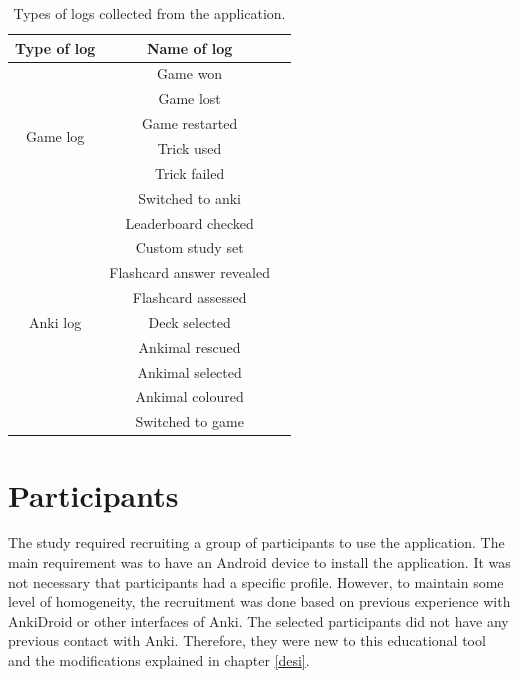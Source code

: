\begin{table}[!htb]
    \centering
    {\renewcommand{\arraystretch}{1}
        \begin{tabular}{ |c|c|c| }
            \hline
            \textbf{Type of log} & \textbf{Name of log} \\
            \hline
            \multirow{6}{3cm}{Game log} &  Game won\\
            & Game lost \\
            & Game restarted \\
            & Trick used \\
            & Trick failed \\
            & Switched to anki \\
            \hline
            \multirow{9}{3cm}{Anki log} &  Leaderboard checked\\
            & Custom study set \\
            & Flashcard answer revealed\\
            & Flashcard assessed \\
            & Deck selected \\
            & Ankimal rescued\\
            & Ankimal selected\\
            & Ankimal coloured\\
            & Switched to game \\
            \hline
        \end{tabular}
    }
    \caption{Types of logs collected from the application.}
    \label{tab:log-types}
\end{table}

\section{Participants}
\label{participants}
The study required recruiting a group of participants to use the application. The main requirement was to have an Android device to install the application. It was not necessary that participants had a specific profile. However, to maintain some level of homogeneity, the recruitment was done based on previous experience with AnkiDroid or other interfaces of Anki. The selected participants did not have any previous contact with Anki. Therefore, they were new to this educational tool and the modifications explained in chapter \ref{desi}.

